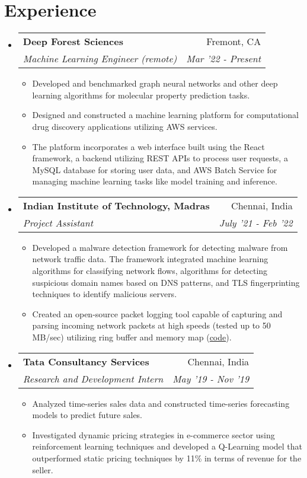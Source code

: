 \documentclass[letterpaper,11pt]{article}
\makeatletter
\newcommand{\resumeItem}[2]{
  \item\small{
    \textbf{#1}{: #2 \vspace{-2pt}}
  }
}
\newcommand{\resumeSubheading}[4]{
  \vspace{-1pt}\item
    \begin{tabular*}{0.97\textwidth}[t]{l@{\extracolsep{\fill}}r}
      \textbf{#1} & #2 \\
      \textit{\small#3} & \textit{\small #4} \\
    \end{tabular*}\vspace{-5pt}
}
\newcommand{\resumeSubSubheading}[2]{
    \begin{tabular*}{0.97\textwidth}{l@{\extracolsep{\fill}}r}
      \textit{\small#1} & \textit{\small #2} \\
    \end{tabular*}\vspace{-5pt}
}
\newcommand{\resumeSubHeadingListStart}{\begin{itemize}[leftmargin=*]}
\newcommand{\resumeSubHeadingListEnd}{\end{itemize}}
\newcommand{\resumeItemListStart}{\begin{itemize}}
\newcommand{\resumeItemListEnd}{\end{itemize}\vspace{-5pt}}
\makeatother
\begin{document}
\section{Experience}
  \resumeSubHeadingListStart
    \resumeSubheading
      {Deep Forest Sciences}{Fremont, CA}
      {Machine Learning Engineer (remote)}{Mar '22 - Present}
      \resumeItemListStart
        \item Developed and benchmarked graph neural networks and other deep learning algorithms for molecular property prediction tasks. 
        \item Designed and constructed a machine learning platform for computational drug discovery applications utilizing AWS services. 
        \item The platform incorporates a web interface built using the React framework, a backend utilizing REST APIs to process user requests, a MySQL database for storing user data, and AWS Batch Service for managing machine learning tasks like model training and inference.
      \resumeItemListEnd

    \resumeSubheading
      {Indian Institute of Technology, Madras}{Chennai, India}
      {Project Assistant}{July '21 - Feb '22}
      \resumeItemListStart
        \item Developed a malware detection framework for detecting malware from network traffic data. The framework integrated machine learning algorithms for classifying network flows, algorithms for detecting suspicious domain names based on DNS patterns, and TLS fingerprinting techniques to identify malicious servers. 
        \item Created an open-source packet logging tool capable of capturing and parsing incoming network packets at high speeds (tested up to 50 MB/sec) utilizing ring buffer and memory map (\href{https://github.com/arunppsg/packet-sniffer}{code}).
      \resumeItemListEnd
     
    \resumeSubheading
      {Tata Consultancy Services}{Chennai, India}
      {Research and Development Intern}{May '19 - Nov '19}
      \resumeItemListStart
        \item Analyzed time-series sales data and constructed time-series forecasting models to predict future sales. 
        \item Investigated dynamic pricing strategies in e-commerce sector using reinforcement learning techniques and developed a Q-Learning model that outperformed static pricing techniques by 11\% in terms of revenue for the seller. 
      \resumeItemListEnd
  \resumeSubHeadingListEnd
\end{document}

